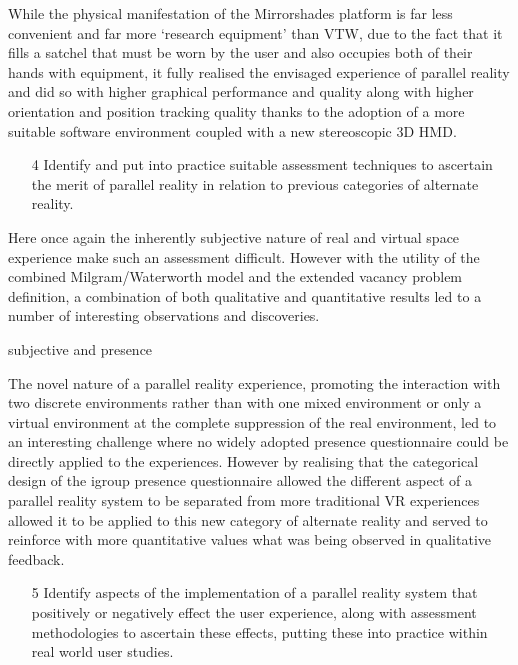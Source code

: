 While the physical manifestation of the Mirrorshades platform is far less convenient and far more `research equipment' than VTW, due to the fact that it fills a satchel that must be worn by the user and also occupies both of their hands with equipment, it fully realised the envisaged experience of parallel reality and did so with higher graphical performance and quality along with higher orientation and position tracking quality thanks to the adoption of a more suitable software environment coupled with a new stereoscopic 3D HMD.


\begin{enumerate}	
	\item[4] Identify and put into practice suitable assessment techniques to ascertain the merit of parallel reality in relation to previous categories of alternate reality.
\end{enumerate}

Here once again the inherently subjective nature of real and virtual space experience make such an assessment difficult. However with the utility of the combined Milgram/Waterworth model and the extended vacancy problem definition, a combination of both qualitative and quantitative results led to a number of interesting observations and discoveries.

subjective and presence

The novel nature of a parallel reality experience, promoting the interaction with two discrete environments rather than with one mixed environment or only a virtual environment at the complete suppression of the real environment, led to an interesting challenge where no widely adopted presence questionnaire could be directly applied to the experiences. However by realising that the categorical design of the igroup presence questionnaire allowed the different aspect of a parallel reality system to be separated from more traditional VR experiences allowed it to be applied to this new category of alternate reality and served to reinforce with more quantitative values what was being observed in qualitative feedback.
	
\begin{enumerate}
	\item[5] Identify aspects of the implementation of a parallel reality system that positively or negatively effect the user experience, along with assessment methodologies to ascertain these effects, putting these into practice within real world user studies.
\end{enumerate}

